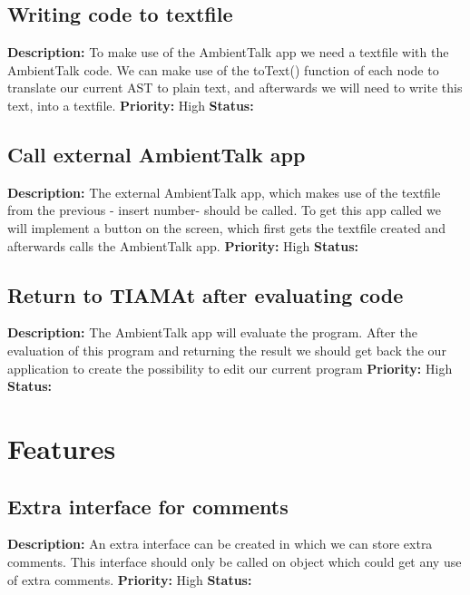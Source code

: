 \documentclass{article}
\begin{document}
\subsection{Writing code to textfile}
\textbf{Description: }To make use of the AmbientTalk app we need a textfile with the AmbientTalk code. We can make use of the toText() function of each node to translate our
current AST to plain text, and afterwards we will need to write this text, into a textfile.  \newline
\textbf{Priority:} High \newline
\textbf{Status: } \newline
\subsection{Call external AmbientTalk app}
\textbf{Description: }The external AmbientTalk app, which makes use of the textfile from the previous - insert number- should be called. To get this app called we will implement
a button on the screen, which first gets the textfile created and afterwards calls the AmbientTalk app. \newline
\textbf{Priority:} High \newline
\textbf{Status: } \newline
\subsection{Return to TIAMAt after evaluating code}
\textbf{Description: } The AmbientTalk app will evaluate the program. After the evaluation of this program and returning the result we should get back the our application to
create the possibility to edit our current program\newline
\textbf{Priority:} High \newline
\textbf{Status: } \newline
\section{Features}
\subsection{Extra interface for comments}
\textbf{Description: } An extra interface can be created in which we can store extra comments. This interface should only be called on object which could get any use of extra comments.
 \newline
\textbf{Priority:} High \newline
\textbf{Status: } \newline
\end{document}
